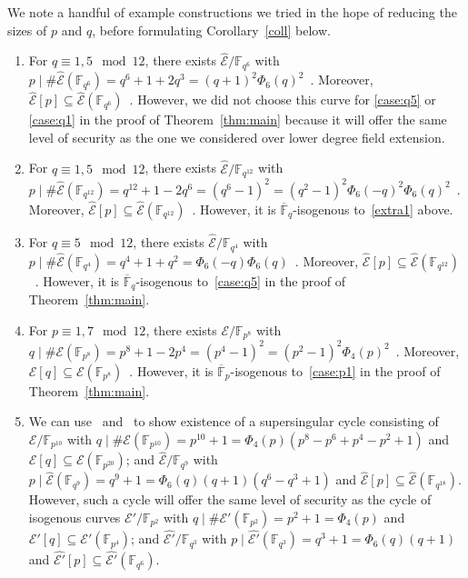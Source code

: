 \documentclass[version=preprint]{iacrcc}
\newcommand{\F}{\mathbb{F}}
\newcommand{\EC}{\mathcal{E}}
\begin{document}
\begin{remark}\label{rem:q}
    We note a handful of example constructions we tried in the hope of reducing the sizes of $p$ and $q$, before formulating Corollary~\ref{coll} below. 
    \begin{enumerate}[label={(\Roman*)}]
        \item For $q\equiv 1,5\mod 12$, there exists $\hat{\EC}/\F_{q^6}$ with $p\mid \#\hat{\EC}(\F_{q^6}) = q^6 + 1 + 2q^3 = (q+1)^2\Phi_6(q)^2$~\cite[Theorem 4.1(2)]{waterhouse}. Moreover, $\hat{\EC}[p]\subseteq \hat{\EC}(\F_{q^6})$~\cite[Theorem IX.20]{GalbraithBSS}. However, we did not choose this curve for \ref{case:q5} or \ref{case:q1} in the proof of Theorem~\ref{thm:main} because it will offer the same level of security as the one we considered over lower degree field extension. \label{extra1}
        \item For $q\equiv 1,5\mod 12$, there exists $\hat{\EC}/\F_{q^{12}}$ with $p\mid \#\hat{\EC}(\F_{q^{12}}) = q^{12} + 1 - 2q^6 = (q^6-1)^2=(q^2-1)^2\Phi_6(-q)^2\Phi_6(q)^2$~\cite[Theorem 4.1(2)]{waterhouse}. Moreover, $\hat{\EC}[p]\subseteq \hat{\EC}(\F_{q^{12}})$~\cite[Theorem IX.20]{GalbraithBSS}. However, it is $\overline{\F}_{q}$-isogenous to~\ref{extra1} above.
        \item For $q\equiv 5\mod 12$, there exists $\hat{\EC}/\F_{q^4}$ with $p\mid \#\hat{\EC}(\F_{q^4}) = q^4 + 1 + q^2 = \Phi_6(-q)\Phi_6(q)$~\cite[Theorem 4.1(3)]{waterhouse}. Moreover, $\hat{\EC}[p]\subseteq \hat{\EC}(\F_{q^{12}})$~\cite[Theorem IX.20]{GalbraithBSS}. However, it is $\overline{\F}_{q}$-isogenous to~\ref{case:q5} in the proof of Theorem~\ref{thm:main}.
	\item For $p\equiv 1,7\mod 12$, there exists $\EC/\F_{p^{8}}$ with $q\mid \#\EC(\F_{p^8}) = p^8 + 1 - 2p^4 = (p^4-1)^2=(p^2-1)^2\Phi_4(p)^2$~\cite[Theorem 4.1(2)]{waterhouse}. Moreover, $\EC[q]\subseteq \EC(\F_{p^{8}})$~\cite[Theorem IX.20]{GalbraithBSS}. However, it is $\overline{\F}_{p}$-isogenous to~\ref{case:p1} in the proof of Theorem~\ref{thm:main}.
	\item     We can use~\cite[Theorem 4.1]{waterhouse} and~\cite[Proposition 3.7]{Schoof87} to show existence of a supersingular cycle consisting of $\EC/\F_{p^{10}}$ with $q\mid \#\EC(\F_{p^{10}}) = p^{10} + 1 = \Phi_4(p)(p^8-p^6+p^4-p^2+1)$ and $\EC[q] \subseteq \EC(\F_{p^{20}})$; and $\hat{\EC}/\F_{q^{9}}$ with $p\mid \hat{\EC}(\F_{q^{9}}) = q^9+1 = \Phi_6(q)(q+1)(q^6-q^3+1)$ and $\hat{\EC}[p] \subseteq \hat{\EC}(\F_{q^{18}})$. However, such a cycle will offer the same level of security as the cycle of isogenous curves $\EC'/\F_{p^{2}}$ with $q\mid \#\EC'(\F_{p^{2}}) = p^{2} + 1 = \Phi_4(p)$ and $\EC'[q] \subseteq \EC'(\F_{p^{4}})$; and $\hat{\EC'}/\F_{q^{3}}$ with $p\mid \hat{\EC'}(\F_{q^{3}}) = q^3+1 = \Phi_6(q)(q+1)$  and $\hat{\EC'}[p] \subseteq \hat{\EC'}(\F_{q^{6}})$.
    \end{enumerate} 
\end{remark}
\end{document}
